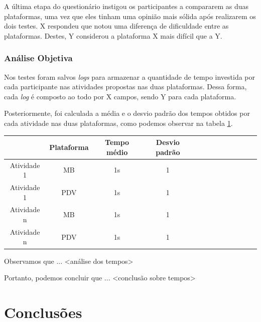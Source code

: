 \documentclass[cic,tc]{iiufrgs}
\begin{document}
A última etapa do questionário instigou os participantes a compararem as duas plataformas, uma vez que eles tinham uma opinião mais sólida após realizarem os dois testes. X respondeu que notou uma diferença de dificuldade entre as plataformas. Destes, Y considerou a plataforma X mais difícil que a Y.


\subsection{Análise Objetiva}
\label {avaliacaoAnaliseObjetiva}

Nos testes foram salvos \textit{logs} para armazenar a quantidade de tempo investida por cada participante nas atividades propostas nas duas plataformas. Dessa forma, cada \textit{log} é composto ao todo por X campos, sendo Y para cada plataforma.

Posteriormente, foi calculada a média e o desvio padrão dos tempos obtidos por cada atividade nas duas plataformas, como podemos observar na tabela \ref{tableAvalObj}.

\begin{table}[h]
    \begin{adjustwidth}{-0.7in}{-0.7in}
    \begin{center}
    \begin{tabular}{ccccccccccccc}
    \hline
     & Plataforma & Tempo médio & Desvio padrão \\
    \hline
    Atividade 1 & MB & 1s & 1 \\
    Atividade 1 & PDV & 1s & 1 \\
    Atividade n & MB & 1s & 1 \\
    Atividade n & PDV & 1s & 1 \\
    \hline
    \end{tabular}
    \end{center}
    \end{adjustwidth}
    \bigskip
    \label{tableAvalObj}
\end{table}

Observamos que ... <análise dos tempos>

Portanto, podemos concluir que ... <conclusão sobre tempos>

\chapter{Conclusões}
\label{conclusao}
\end{document}
